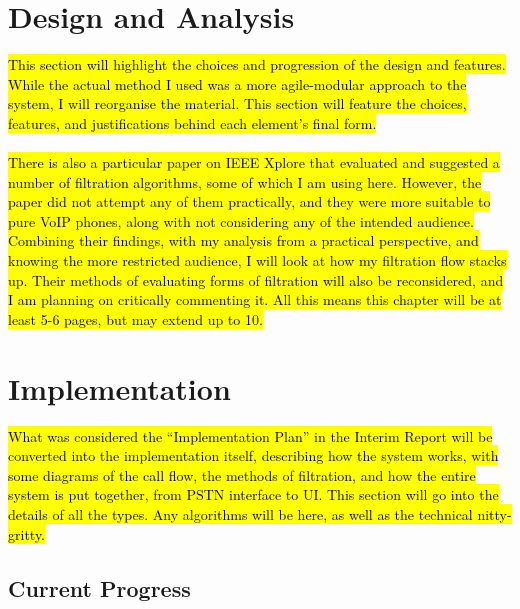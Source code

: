 \documentclass[12pt,a4paper]{report}
\begin{document}
\chapter{Design and Analysis}
\hl{This section will highlight the choices and progression of the design and features. While the actual method I used was a more agile-modular approach to the system, I will reorganise the material. This section will feature the choices, features, and justifications behind each element's final form.}
\\\\
\hl{There is also a particular paper on IEEE Xplore that evaluated and suggested a number of filtration algorithms, some of which I am using here. However, the paper did not attempt any of them practically, and they were more suitable to pure VoIP phones, along with not considering any of the intended audience. Combining their findings, with my analysis from a practical perspective, and knowing the more restricted audience, I will look at how my filtration flow stacks up. Their methods of evaluating forms of filtration will also be reconsidered, and I am planning on critically commenting it. All this means this chapter will be at least 5-6 pages, but may extend up to 10.}

\newpage
\chapter{Implementation }
\hl{What was considered the ``Implementation Plan'' in the Interim Report will be converted into the implementation itself, describing how the system works, with some diagrams of the call flow, the methods of filtration, and how the entire system is put together, from PSTN interface to UI. This section will go into the details of all the types. Any algorithms will be here, as well as the technical nitty-gritty. }

\section{Current Progress}
\end{document}
